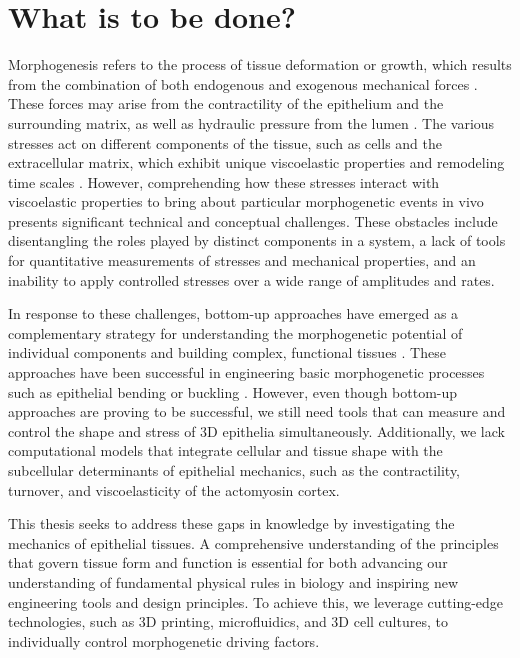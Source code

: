 \hypertarget{what-is-to-be-done}{%
\section{What is to be done?}\label{what-is-to-be-done}}

Morphogenesis refers to the process of tissue deformation or growth, which results from the combination of both endogenous and exogenous mechanical forces \cite{valet2022, collinet2021}. These forces may arise from the contractility of the epithelium and the surrounding matrix, as well as hydraulic pressure from the lumen \cite{torres-sanchez2021, chan2020}. The various stresses act on different components of the tissue, such as cells and the extracellular matrix, which exhibit unique viscoelastic properties and remodeling time scales \cite{cavanaugh2020, kelkar2020, ambrosi2019}. However, comprehending how these stresses interact with viscoelastic properties to bring about particular morphogenetic events in vivo presents significant technical and conceptual challenges. These obstacles include disentangling the roles played by distinct components in a system, a lack of tools for quantitative measurements of stresses and mechanical properties, and an inability to apply controlled stresses over a wide range of amplitudes and rates.

In response to these challenges, bottom-up approaches have emerged as a complementary strategy for understanding the morphogenetic potential of individual components and building complex, functional tissues \cite{trentesaux2023, ingber2018}. These approaches have been successful in engineering basic morphogenetic processes such as epithelial bending or buckling \cite{matejcic2022}. However, even though bottom-up approaches are proving to be successful, we still need tools that can measure and control the shape and stress of 3D epithelia simultaneously. Additionally, we lack computational models that integrate cellular and tissue shape with the subcellular determinants of epithelial mechanics, such as the contractility, turnover, and viscoelasticity of the actomyosin cortex.

This thesis seeks to address these gaps in knowledge by investigating the mechanics of epithelial tissues. A comprehensive understanding of the principles that govern tissue form and function is essential for both advancing our understanding of fundamental physical rules in biology and inspiring new engineering tools and design principles. To achieve this, we leverage cutting-edge technologies, such as 3D printing, microfluidics, and 3D cell cultures, to individually control morphogenetic driving factors. 


